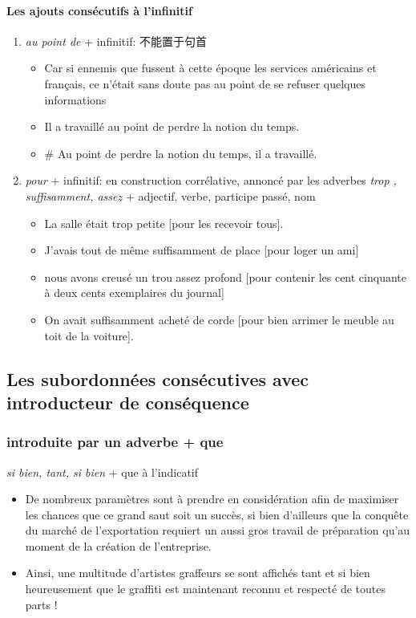 \documentclass[UTF8]{report}
\begin{document}
\paragraph{Les ajouts consécutifs à l’infinitif}
\begin{enumerate}
    \item \textit{au point de} + infinitif: 不能置于句首
    \begin{itemize}
        \item Car si ennemis que fussent à cette époque les services américains et français, ce n’était sans doute pas au point de se refuser quelques informations
        \item Il a travaillé au point de perdre la notion du temps.
        \item \# Au point de perdre la notion du temps, il a travaillé.
    \end{itemize}
    \item \textit{pour} + infinitif: en construction corrélative, annoncé par les adverbes \textit{trop , suffisamment, assez} + adjectif, verbe, participe passé, nom
    \begin{itemize}
        \item La salle était trop petite [pour les recevoir tous].
        \item J’avais tout de même suffisamment de place [pour loger un ami]
        \item nous avons creusé un trou assez profond [pour contenir les cent cinquante à deux cents exemplaires du journal]
        \item On avait suffisamment acheté de corde [pour bien arrimer le meuble au toit de la voiture].
    \end{itemize}
\end{enumerate}

\subsection{Les subordonnées consécutives avec introducteur de conséquence}

\subsubsection{introduite par un adverbe + que}
\textit{si bien, tant, si bien} + que à l’indicatif
\begin{itemize}
    \item De nombreux paramètres sont à prendre en considération afin de maximiser les chances que ce grand saut soit un succès, si bien d’ailleurs que la conquête du marché de l’exportation requiert un aussi gros travail de préparation qu’au moment de la création de l’entreprise.
    \item Ainsi, une multitude d’artistes graffeurs se sont affichés tant et si bien heureusement que le graffiti est maintenant reconnu et respecté de toutes parts !
\end{itemize}
\end{document}
